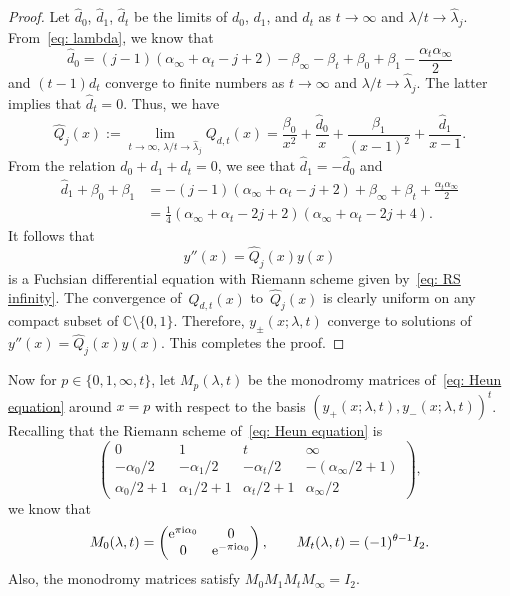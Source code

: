 \documentclass[10pt,a4paper]{amsart}
\numberwithin{equation}{section}
\def\C{\mathbb C}
\def\M#1#2#3#4{\begin{pmatrix}#1&#2\\#3&#4\end{pmatrix}}
\begin{document}
\begin{proof} Let $\hat d_0$, $\hat d_1$, $\hat d_t$ be the limits of $d_0$,
 $d_1$, and $d_t$ as $t\to\infty$ and $\lambda/t\to\hat\lambda_j$.
 From~\eqref{eq: lambda}, we know that
\[
 \hat d_0=(j-1)(\alpha_\infty+\alpha_t-j+2)
 -\beta_\infty-\beta_t+\beta_0+\beta_1-\frac{\alpha_t\alpha_\infty}2
\]
 and $(t-1)d_t$ converge to finite numbers as $t\to\infty$ and
 $\lambda/t\to\hat\lambda_j$. The latter implies that
 $\hat d_t=0$. Thus, we have
\[
 \hat Q_j(x):=\lim_{t\to\infty,\,\lambda/t\to\hat\lambda_j}Q_{d,t}(x)
 =\frac{\beta_0}{x^2}+\frac{\hat d_0}x
 +\frac{\beta_1}{(x-1)^2}+\frac{\hat d_1}{x-1}.
\]
 From the relation $d_0+d_1+d_t=0$, we see that $\hat d_1=-\hat d_0$
 and
 \begin{equation*}
 \begin{split}
 \hat d_1+\beta_0+\beta_1
 &{}=-(j-1)(\alpha_\infty+\alpha_t-j+2)+\beta_\infty+\beta_t
 +\frac{\alpha_t\alpha_\infty}2 \\
 &{}=\frac14(\alpha_\infty+\alpha_t-2j+2)
 (\alpha_\infty+\alpha_t-2j+4).
 \end{split}
 \end{equation*}
 It follows that
\[
 y''(x)=\hat Q_j(x)y(x)
\]
 is a Fuchsian differential equation with Riemann scheme
 given by~\eqref{eq: RS infinity}. The convergence of~$Q_{d,t}(x)$ to~$\hat Q_j(x)$ is clearly uniform on any compact subset of ${\C\setminus\{0,1\}}$.
 Therefore, $y_\pm(x;\lambda,t)$ converge to solutions of
 $y''(x)=\hat Q_j(x)y(x)$. This completes the proof.
\end{proof}

Now for $p\in\{0,1,\infty,t\}$, let $M_p(\lambda,t)$ be the monodromy
matrices of~\eqref{eq: Heun equation} around $x=p$ with respect to the
basis $(y_+(x;\lambda,t),y_-(x;\lambda,t))^t$.
Recalling that the Riemann scheme of~\eqref{eq: Heun equation} is
\[
\begin{pmatrix}
 0 & 1 & t & \infty \\
 -\alpha_0/2 & -\alpha_1/2 & -\alpha_t/2 & -(\alpha_\infty/2+1) \\
 \alpha_0/2+1 & \alpha_1/2+1 & \alpha_t/2+1 & \alpha_\infty/2
\end{pmatrix},
\]
we know that
\[
M_0(\lambda,t)=\M{{\rm e}^{\pi {\rm i}\alpha_0}}00{{\rm e}^{-\pi {\rm i}\alpha_0}}, \qquad
M_t(\lambda,t)=(-1)^{\theta-1}I_2.
\]
Also, the monodromy matrices satisfy $M_0M_1M_tM_\infty=I_2$.
\end{document}
